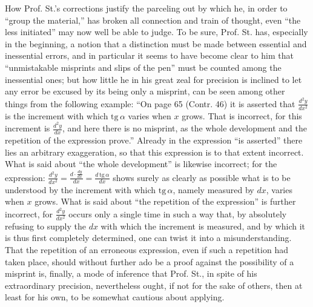 \documentclass[12pt,a4paper,openany]{book}
\newcommand{\opage}[1]{\marginnote{\footnotesize\textit{[#1]}}}
\begin{document}
How Prof. St.'s corrections justify the
parceling out by which he, in order to ``group the material,'' has
broken all connection and train of thought, even ``the less initiated'' may now well be able to judge. To be sure,
Prof. St. has, especially in the beginning, a notion
that a distinction must be made between essential and inessential errors, and in particular it seems to have become clear to
him that ``unmistakable misprints and slips of the pen'' must be counted among the inessential ones; but how little he in his great
zeal for precision is inclined to let any error be excused
by its being only a misprint, can be seen among other things
from the following example: ``On page 65 (Contr. 46) it is asserted that
$\frac{d^{2}y}{dx^{2}}$ is the increment with which $\mathrm{tg}\,\alpha$ varies when $x$ grows.
That is incorrect, for this increment is $\frac{d^{2}y}{dx}$, and here there is no misprint, as the whole development and the repetition of the expression
prove.'' Already in the expression ``is asserted'' there lies an arbitrary exaggeration, so that this expression is to that extent incorrect.
What is said about ``the whole development'' is likewise incorrect;
\opage{49}\setcounter{footnote}{0}%
for the expression: $\frac{d^{2}y}{dx^{2}} = \frac{d \cdot \frac{dy}{dx}}{dx} = \frac{d\,\mathrm{tg}\,\alpha}{dx}$ shows surely
as clearly as possible what is to be understood by the
increment with which $\mathrm{tg}\,\alpha$, namely measured by $dx$, varies
when $x$ grows. What is said about ``the repetition of the expression''
is further incorrect, for $\frac{d^{2}y}{dx^{2}}$ occurs only a single
time in such a way that, by absolutely refusing to supply the
$dx$ with which the increment is measured, and by which it is thus first
completely determined, one can twist it into a misunderstanding.
That the repetition of an erroneous expression, even if such a
repetition had taken place, should without further ado be a
proof against the possibility of a misprint is, finally, a
mode of inference that Prof. St., in spite of his extraordinary
precision, nevertheless ought, if not for the sake of others, then at least for
his own, to be somewhat cautious about applying.
\end{document}
